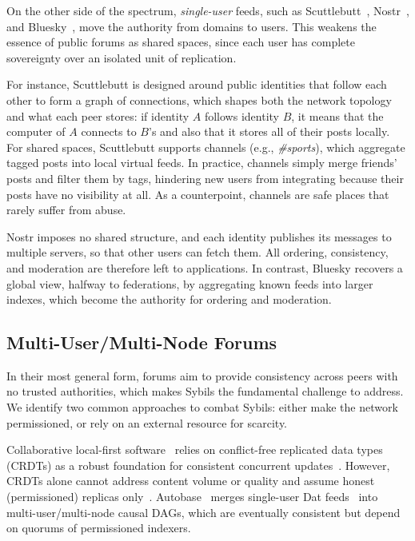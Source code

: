 \documentclass[10pt,twocolumn]{article}
\begin{document}
On the other side of the spectrum, \emph{single-user} feeds, such as
Scuttlebutt~\cite{p2p.scuttlebutt}, Nostr~\cite{p2p.nostr.nip01}, and
Bluesky~\cite{p2p.atproto}, move the authority from domains to users.
This weakens the essence of public forums as shared spaces, since each user has
complete sovereignty over an isolated unit of replication.

For instance, Scuttlebutt is designed around public identities that follow each
other to form a graph of connections, which shapes both the network topology
and what each peer stores:
    if identity $A$ follows identity $B$, it means that the computer of $A$
    connects to $B$'s and also that it stores all of their posts locally.
%
For shared spaces, Scuttlebutt supports channels (e.g., \emph{\#sports}), which
aggregate tagged posts into local virtual feeds.
In practice, channels simply merge friends' posts and filter them by tags,
hindering new users from integrating because their posts have no visibility
at all.
As a counterpoint, channels are safe places that rarely suffer from abuse.

Nostr imposes no shared structure, and each identity publishes its messages to
multiple servers, so that other users can fetch them.
All ordering, consistency, and moderation are therefore left to applications.
%
In contrast, Bluesky recovers a global view, halfway to federations, by
aggregating known feeds into larger indexes, which become the authority for
ordering and moderation.

\subsection{Multi-User/Multi-Node Forums}
\label{sec.related.multi}

In their most general form, forums aim to provide consistency across peers with
no trusted authorities, which makes Sybils the fundamental challenge to
address.
%
We identify two common approaches to combat Sybils:
either make the network permissioned, or rely on an external resource for
scarcity.

Collaborative local-first software~\cite{p2p.local,p2p.automerge,p2p.pushpin}
relies on conflict-free replicated data types (CRDTs) as a
robust foundation for consistent concurrent updates~\cite{p2p.crdts}.
However, CRDTs alone cannot address content volume or quality and assume honest
(permissioned) replicas only~\cite{p2p.merkle-crdts,p2p.byz,p2p.dag.sync}.
%
Autobase~\cite{p2p.autobase} merges single-user Dat feeds~\cite{p2p.dat} into
multi-user/multi-node causal DAGs, which are eventually consistent but depend
on quorums of permissioned indexers.
\end{document}
